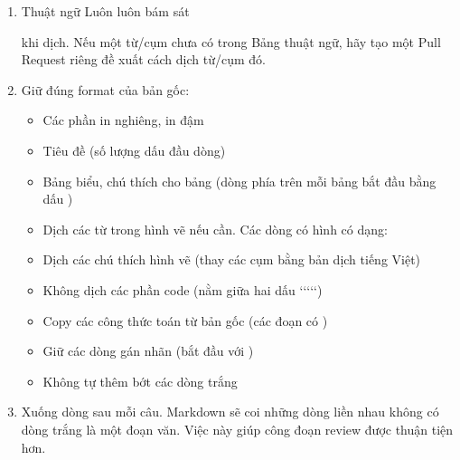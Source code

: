 \documentclass[letterpaper,11pt,english]{sphinxmanual}
\begin{document}
\begin{enumerate}
%
\item {} 
Thuật ngữ Luôn luôn bám sát %
\begin{footnote}[12]\sphinxAtStartFootnote
{}
%
\end{footnote} khi
dịch. Nếu một từ/cụm chưa có trong Bảng thuật ngữ, hãy tạo một Pull
Request riêng đề xuất cách dịch từ/cụm đó.

\item {} 
Giữ đúng format của bản gốc:
\begin{itemize}
\item {} 
Các phần in nghiêng, in đậm

\item {} 
Tiêu đề (số lượng dấu \sphinxcode{\sphinxupquote{\#}} đầu dòng)

\item {} 
Bảng biểu, chú thích cho bảng (dòng phía trên mỗi bảng bắt đầu
bằng dấu \sphinxcode{\sphinxupquote{:}})

\item {} 
Dịch các từ trong hình vẽ nếu cần. Các dòng có hình có dạng:

\item {} 
Dịch các chú thích hình vẽ (thay các cụm
 bằng bản dịch tiếng Việt)

\item {} 
Không dịch các phần code (nằm giữa hai dấu {}`{}`{}`{}`{}`)

\item {} 
Copy các công thức toán từ bản gốc (các đoạn có \sphinxcode{\sphinxupquote{\$}})

\item {} 
Giữ các dòng gán nhãn (bắt đầu với )

\item {} 
Không tự thêm bớt các dòng trắng

\end{itemize}

\item {} 
Xuống dòng sau mỗi câu. Markdown sẽ coi những dòng liền nhau không có
dòng trắng là một đoạn văn. Việc này giúp công đoạn review được thuận
tiện hơn.

\end{enumerate}
\end{document}
